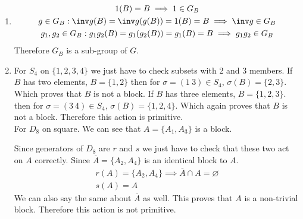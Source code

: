 \begin{enumerate}[label=\ilabel]
    \item
        \begin{gather*}
            1(B) = B \implies 1 \in G_B \\
            g \in G_B: \inv g(B) = \inv g(g(B)) = 1(B) = B \implies \inv g \in G_B \\
            g_1, g_2 \in G_B: g_1g_2(B) = g_1(g_2(B)) = g_1(B) = B  \implies g_1g_2 \in G_B
        \end{gather*}
        Therefore $G_B$ is a sub-group of $G$.
    \item  
        For $S_4$ on $\{1, 2, 3, 4\}$ we just have to check subsets with 2 and 3 members.
        If $B$ has two elements, $B = \{1, 2\}$ then for $\sigma = (1 \ 3) \in S_4$, $\sigma(B) = \{2, 3\}$. Which proves that $B$ is not a block.
        If $B$ has three elements, $B = \{1, 2, 3\}$. then for $\sigma = (3 \ 4) \in S_4$, $\sigma(B) = \{1, 2, 4\}$. Which again proves that $B$ is not a block.
        Therefore this action is primitive. \\
        For $D_8$ on square. We can see that $A = \{A_1, A_3\}$ is a block.
        \begin{center}
        \end{center} 
        Since generators of $D_8$ are $r$ and $s$ we just have to check that these two act on $A$ correctly. Since $\overline{A} = \{A_2, A_4\}$ is an identical block to $A$.
        \begin{gather*}
            r(A) = \{A_2, A_4\} \implies \overline{A} \cap A = \varnothing \\
            s(A) = A
        \end{gather*}
        We can also say the same about $\overline{A}$ as well. \newline
        This proves that $A$ is a non-trivial block. Therefore this action is not primitive.
\end{enumerate}